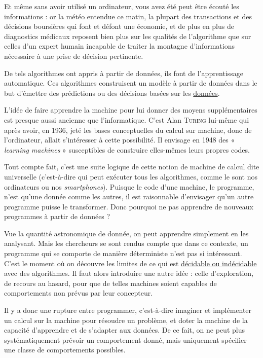 Et même sans avoir utilisé un ordinateur, vous avez été peut être écouté les informations : or la météo entendue ce matin, la plupart des transactions et des décisions boursières qui font et défont une économie, et de plus en plus de diagnostics médicaux reposent bien plus sur les qualités de l’algorithme que sur celles d’un expert humain incapable de traiter la montagne d’informations nécessaire à une prise de décision pertinente.

De tels algorithmes ont appris à partir de données, ils font de l’apprentissage automatique. Ces algorithmes construisent un modèle à partir de données dans le but d’émettre des prédictions ou des décisions basées sur les \href{https://en.wikipedia.org/wiki/Machine_learning}{données}.


L’idée de faire apprendre la machine pour lui donner des moyens supplémentaires est presque aussi ancienne que l’informatique. C’est Alan \textsc{Turing} lui-même qui après avoir, en 1936, jeté les bases conceptuelles du calcul sur machine, donc de l’ordinateur, allait s’intéresser à cette possibilité. Il envisage en 1948 des « \textit{learning machines} » susceptibles de construire elles-mêmes leurs propres codes.

%
Tout compte fait, c’est une suite logique de cette notion de machine de calcul dite universelle (c’est-à-dire qui peut exécuter tous les algorithmes, comme le sont nos ordinateurs ou nos \textit{smartphones}). Puisque le code d’une machine, le programme, n’est qu’une donnée comme les autres, il est raisonnable d’envisager qu’un autre programme puisse le transformer. Donc pourquoi ne pas apprendre de nouveaux program\-mes à partir de données ?

Vue la quantité astronomique de donnée, on peut apprendre simplement en les analysant. Mais les chercheurs se sont rendus compte que dans ce contexte, un programme qui se comporte de manière déterministe n’est pas si intéressant. C’est le moment où on découvre les limites de ce qui est \href{https://www.lemonde.fr/blog/binaire/2015/06/17/decidable-indecidable/}{décidable ou indécidable} avec des algorithmes. Il faut alors introduire une autre idée : celle d’exploration, de recours au hasard, pour que de telles machines soient capables de comportements non prévus par leur concepteur.

Il y a donc une rupture entre programmer, c’est-à-dire imaginer et implémenter un calcul sur la machine pour résoudre un problème, et doter la machine de la capacité d’apprendre et de s’adapter aux données. De ce fait, on ne peut plus systématiquement prévoir un comportement donné, mais uniquement spécifier une classe de comportements possibles.

